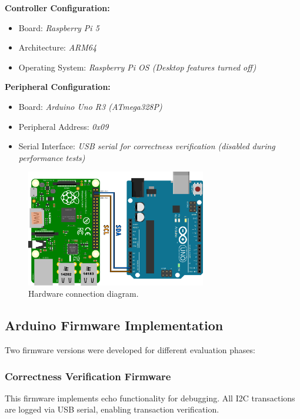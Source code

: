 \textbf{Controller Configuration:}
\begin{itemize}
    \item Board: \textit{Raspberry Pi 5}
    \item Architecture: \textit{ARM64} %
    \item Operating System: \textit{Raspberry Pi OS (Desktop features turned off)}
\end{itemize}

\textbf{Peripheral Configuration:}
\begin{itemize}
    \item Board: \textit{Arduino Uno R3 (ATmega328P)}
    \item Peripheral Address: \textit{0x09}
    \item Serial Interface: \textit{USB serial for correctness verification (disabled during performance tests)}
\end{itemize}

\begin{figure}[h]
	\centering
	\includegraphics[width=0.7\textwidth]{images/HW_config.png}
	\caption{Hardware connection diagram.}
	\label{fig:hw-connection}
\end{figure}

\subsection{Arduino Firmware Implementation}
\label{subsec:eval-setup-fw}

Two firmware versions were developed for different evaluation phases:

\subsubsection{Correctness Verification Firmware}
This firmware implements echo functionality for debugging. All I2C transactions are logged via USB serial, enabling transaction verification.


